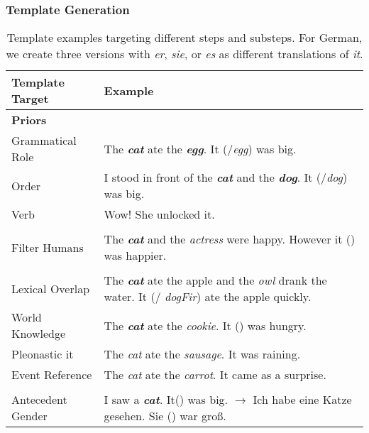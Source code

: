 \subsubsection{Template Generation}
\label{sec:template}

\begin{table}[t]
	\small
	\centering
	\begin{tabular}{p{4.5cm} p{9cm} }
		\textbf{Template Target} & \textbf{Example} \\
		\hline
		
		\noalign{\vskip 2mm} 
		\textbf{Priors} & \\
		Grammatical Role & The \emph{\textbf{cat}} ate the \emph{\textbf{egg}}. It (\cat{}/{\textit{egg}}) was big. \\
		Order & I stood in front of the \emph{\textbf{cat}} and the \emph{\textbf{dog}}. It (\cat{}/\textit{dog}) was big. \\
		Verb & Wow! She unlocked it. \\
		
		
		\noalign{\vskip 2mm} 
		\rowcolor{gray!25}
		\textbf{\stepone{}} & \\
		\rowcolor{gray!25}
		Filter Humans & The \textit{\textbf{cat}}  and the \textit{actress} were happy. However it (\cat{}) was happier.  \\
		
		\noalign{\vskip 2mm} 
		\textbf{\steptwo{}} & \\
		Lexical Overlap & The \textit{\textbf{cat}} ate the apple and the \textit{owl} drank the water. It (\cat{}/ \textit{dogFir}) ate the apple quickly. \\
		World Knowledge & The \textit{\textbf{cat}} ate the \textit{cookie}. It (\cat{}) was hungry. \\
		Pleonastic it & The \emph{cat} ate the \emph{sausage}. It was raining. \\
		Event Reference  & The \emph{cat} ate the \emph{carrot}. It came as a surprise. \\
		
		\rowcolor{gray!25}
		\noalign{\vskip 2mm} 
		\textbf{\stepthree{}} & \\
		\rowcolor{gray!25}
		Antecedent Gender &
		I saw a \textit{\textbf{cat}}. It(\cat{}) was big. 
		$\rightarrow$
		\newline
		Ich habe eine Katze gesehen. Sie (\cat{}) war gro{\ss}.
	\end{tabular}
	\caption{Template examples targeting different \coref{} steps and substeps. 
		For German, we create three versions with \emph{er}, \emph{sie}, or \emph{es} as different translations of \emph{it}.
	}
	\label{tab:templates}
\end{table}

